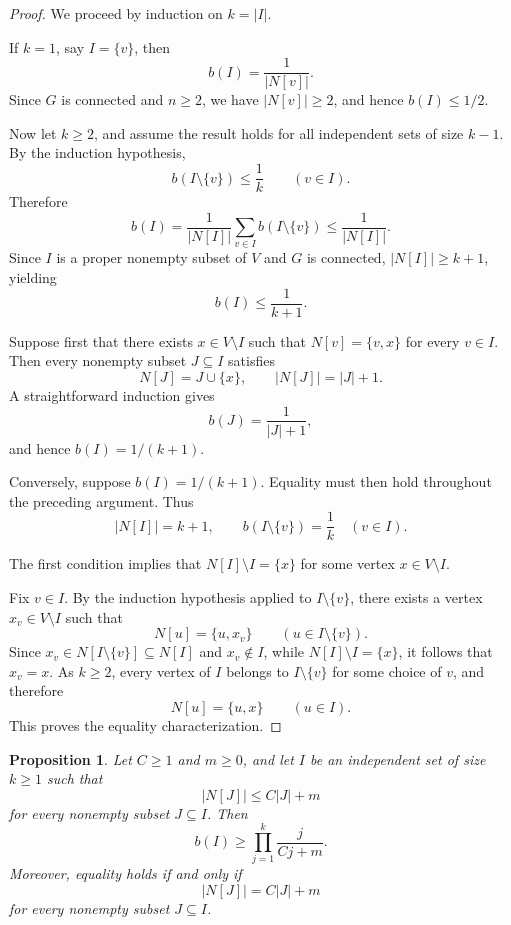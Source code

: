 \documentclass[11pt,a4paper]{article}
\numberwithin{equation}{section}
\theoremstyle{plain}
\newtheorem{proposition}[theorem]{Proposition}
\theoremstyle{definition}
\theoremstyle{remark}
\begin{document}
\begin{proof}
We proceed by induction on \(k=|I|\).

If \(k=1\), say \(I=\{v\}\), then
\[
b(I)=\frac1{|N[v]|}.
\]
Since \(G\) is connected and \(n\ge2\), we have \(|N[v]|\ge2\), and hence \(b(I)\le1/2\).

Now let \(k\ge2\), and assume the result holds for all independent sets of size \(k-1\). By the induction hypothesis,
\[
b(I\setminus\{v\})\le \frac1k
\qquad
(v\in I).
\]
Therefore
\[
b(I)
=
\frac1{|N[I]|}
\sum_{v\in I} b(I\setminus\{v\})
\le
\frac1{|N[I]|}.
\]
Since \(I\) is a proper nonempty subset of \(V\) and \(G\) is connected, \(|N[I]|\ge k+1\), yielding
\[
b(I)\le \frac1{k+1}.
\]

Suppose first that there exists \(x\in V\setminus I\) such that \(N[v]=\{v,x\}\) for every \(v\in I\). Then every nonempty subset \(J\subseteq I\) satisfies
\[
N[J]=J\cup\{x\},
\qquad
|N[J]|=|J|+1.
\]
A straightforward induction gives
\[
b(J)=\frac1{|J|+1},
\]
and hence \(b(I)=1/(k+1)\).

Conversely, suppose \(b(I)=1/(k+1)\). Equality must then hold throughout the preceding argument. Thus
\[
|N[I]|=k+1,
\qquad
b(I\setminus\{v\})=\frac1k
\quad (v\in I).
\]

The first condition implies that \(N[I]\setminus I=\{x\}\) for some vertex \(x\in V\setminus I\).

Fix \(v\in I\). By the induction hypothesis applied to \(I\setminus\{v\}\), there exists a vertex \(x_v\in V\setminus I\) such that
\[
N[u]=\{u,x_v\}
\qquad
(u\in I\setminus\{v\}).
\]
Since \(x_v\in N[I\setminus\{v\}] \subseteq N[I]\) and
\(x_v\notin I\), while \(N[I]\setminus I=\{x\}\),
it follows that \(x_v=x\). As \(k\ge2\), every vertex of \(I\) belongs to \(I\setminus\{v\}\) for some choice of \(v\), and therefore
\[
N[u]=\{u,x\}
\qquad
(u\in I).
\]
This proves the equality characterization.
\end{proof}

\begin{proposition}
\label{prop:b_lower}
Let \(C\ge1\) and \(m\ge0\), and let \(I\) be an independent set of size \(k\ge1\) such that
\[
|N[J]|\le C|J|+m
\]
for every nonempty subset \(J\subseteq I\). Then
\[
b(I)\ge
\prod_{j=1}^{k}
\frac{j}{Cj+m}.
\]
Moreover, equality holds if and only if
\[
|N[J]|=C|J|+m
\]
for every nonempty subset \(J\subseteq I\).
\end{proposition}
\end{document}
